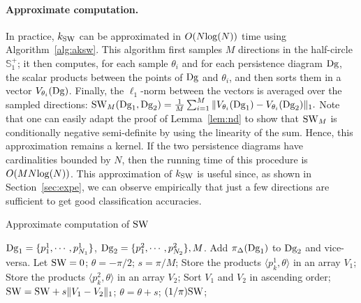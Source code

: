 \paragraph*{Approximate computation.} In practice, $k_{\rm SW}$ can be approximated in $O(N{\rm log}(N))$
time using Algorithm~\ref{alg:aksw}. This algorithm first samples $M$ directions
in the half-circle $\mathbb{S}^+_1$; it then computes, for
each sample $\theta_i$ and for each persistence diagram $\mathrm{Dg}$, the scalar
products between the points of $\mathrm{Dg}$ and $\theta_i$, and then sorts them in a
vector $V_{\theta_i}(\mathrm{Dg})$. Finally, the $\ell_1$-norm between the vectors 
is averaged over the sampled directions:
$\SW_M(\dg_1,\dg_2)%
=\frac 1M \sum_{i=1}^M \|V_{\theta_i}(\dg_1)-V_{\theta_i}(\dg_2)\|_1.$
Note that one can easily adapt the proof of Lemma~\ref{lem:nd} to show that ${\rm SW}_M$ 
is conditionally negative semi-definite
by using the linearity of the sum. Hence, this approximation remains a kernel.
If the two persistence diagrams have cardinalities bounded by $N$,
then the running time of this procedure is $O(MN{\rm log}(N))$. This approximation of $k_{\rm SW}$  
is useful since, as shown in Section~\ref{sec:expe}, we can observe empirically that just a 
few directions are sufficient to get good classification accuracies.

\begin{algorithm}
\caption{Approximate computation of ${\rm SW}$}
\label{alg:aksw}
\begin{algorithmic}
 $\mathrm{Dg}_1=\{p^1_1,\cdots,p^1_{N_1}\}$, $\mathrm{Dg}_2=\{p^2_1,\cdots,p^2_{N_2}\}, M$.
\STATE Add $\pi_\Delta(\mathrm{Dg}_1)$ to $\mathrm{Dg}_2$ and vice-versa.
\STATE Let ${\rm SW}=0$; $\theta=-\pi/2$; $s=\pi/M$;
	\STATE Store the products $\langle p_k^1,\theta\rangle$ in an array $V_1$;
	\STATE Store the
 products $\langle p_k^2,\theta\rangle$ in an array $V_2$;
	\STATE Sort $V_1$ and $V_2$ in ascending order;
	\STATE ${\rm SW}={\rm SW}+s \|V_1-V_2\|_1$;
	\STATE $\theta= \theta + s$;
\ENDFOR
{} $(1/\pi){\rm SW}$;
\end{algorithmic}
\end{algorithm}  

